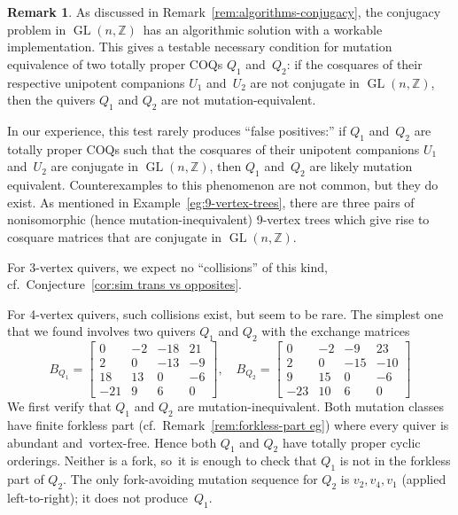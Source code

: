 \documentclass[11pt, letterpaper]{amsart}
\theoremstyle{definition}
\newtheorem{remark}[theorem]{Remark}
\numberwithin{equation}{section}
\def\GL{{\operatorname{GL}}}
\begin{document}
\begin{remark}
\label{rem:conjugacy-vs-mut-equiv}
As discussed in Remark~\ref{rem:algorithms-conjugacy}, the conjugacy problem in $\GL(n,\mathbb{Z})$~has an algorithmic solution with a workable implementation. 
This gives a testable necessary condition for mutation equivalence 
of two totally proper COQs $Q_1$ and~$Q_2$:  
if the cosquares of their respective unipotent companions $U_1$ and~$U_2$ 
are not conjugate in $\GL(n,\mathbb{Z})$, 
then the quivers $Q_1$ and $Q_2$ are not mutation-equivalent. 

In our experience, this test rarely produces ``false positives:'' if $Q_1$ and~$Q_2$ 
are totally proper COQs such that the cosquares of their unipotent companions $U_1$ and~$U_2$
are conjugate  in $\GL(n,\mathbb{Z})$,
then $Q_1$ and~$Q_2$ are likely mutation equivalent. 
Counter\-examples to this phenomenon are not common, but they do exist. 
As mentioned in Example~\ref{eg:9-vertex-trees}, 
there are three pairs of nonisomorphic (hence mutation-inequivalent)
9-vertex trees which give rise to cosquare matrices that are conjugate in $\GL(n,\mathbb{Z})$. 

For 3-vertex quivers, we expect no ``collisions'' of this kind, cf.\ Conjecture~\ref{cor:sim trans vs opposites}. 

For 4-vertex quivers, such collisions exist, but seem to be rare.  
The simplest one that we found involves two quivers $Q_1$ and $Q_2$ with the exchange matrices
\begin{equation*}
B_{Q_1} = 
\begin{bmatrix}
0  & -2 & -18&   21 \\
2  &  0 & -13 &  -9 \\
18  & 13 &   0 &  -6 \\
-21 &   9  &  6  &  0
\end{bmatrix}
, \quad
B_{Q_2}=
\begin{bmatrix}
  0  & -2  & -9  & 23 \\
 2& 0 & -15 & -10 \\
  9  & 15 &   0 &  -6 \\
-23 &  10 &   6  &  0
\end{bmatrix}
\end{equation*}
We first verify that $Q_1$ and $Q_2$ are mutation-inequivalent. 
Both mutation classes have finite forkless part (cf.\ Remark~\ref{rem:forkless-part eg})
where every quiver is abundant \hbox{and vortex-free.} 
Hence both $Q_1$ and $Q_2$ have totally proper cyclic orderings. 
Neither is a fork, so~it \linebreak[3] 
is enough to check that $Q_1$ is not in the forkless part of $Q_2$. 
The only fork-avoiding mutation sequence for $Q_2$ is $v_2, v_4, v_1$ (applied left-to-right);  
it does not produce~$Q_1$.


\end{remark}
\end{document}
